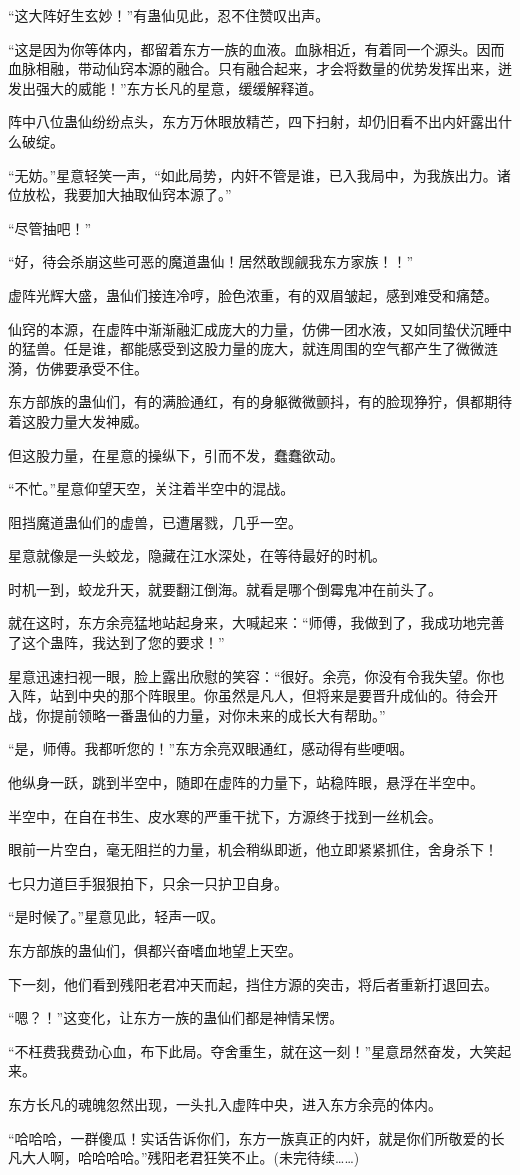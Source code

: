 \begin{this_body}
“这大阵好生玄妙！”有蛊仙见此，忍不住赞叹出声。

“这是因为你等体内，都留着东方一族的血液。血脉相近，有着同一个源头。因而血脉相融，带动仙窍本源的融合。只有融合起来，才会将数量的优势发挥出来，迸发出强大的威能！”东方长凡的星意，缓缓解释道。

阵中八位蛊仙纷纷点头，东方万休眼放精芒，四下扫射，却仍旧看不出内奸露出什么破绽。

“无妨。”星意轻笑一声，“如此局势，内奸不管是谁，已入我局中，为我族出力。诸位放松，我要加大抽取仙窍本源了。”

“尽管抽吧！”

“好，待会杀崩这些可恶的魔道蛊仙！居然敢觊觎我东方家族！！”

虚阵光辉大盛，蛊仙们接连冷哼，脸色浓重，有的双眉皱起，感到难受和痛楚。

仙窍的本源，在虚阵中渐渐融汇成庞大的力量，仿佛一团水液，又如同蛰伏沉睡中的猛兽。任是谁，都能感受到这股力量的庞大，就连周围的空气都产生了微微涟漪，仿佛要承受不住。

东方部族的蛊仙们，有的满脸通红，有的身躯微微颤抖，有的脸现狰狞，俱都期待着这股力量大发神威。

但这股力量，在星意的操纵下，引而不发，蠢蠢欲动。

“不忙。”星意仰望天空，关注着半空中的混战。

阻挡魔道蛊仙们的虚兽，已遭屠戮，几乎一空。

星意就像是一头蛟龙，隐藏在江水深处，在等待最好的时机。

时机一到，蛟龙升天，就要翻江倒海。就看是哪个倒霉鬼冲在前头了。

就在这时，东方余亮猛地站起身来，大喊起来：“师傅，我做到了，我成功地完善了这个蛊阵，我达到了您的要求！”

星意迅速扫视一眼，脸上露出欣慰的笑容：“很好。余亮，你没有令我失望。你也入阵，站到中央的那个阵眼里。你虽然是凡人，但将来是要晋升成仙的。待会开战，你提前领略一番蛊仙的力量，对你未来的成长大有帮助。”

“是，师傅。我都听您的！”东方余亮双眼通红，感动得有些哽咽。

他纵身一跃，跳到半空中，随即在虚阵的力量下，站稳阵眼，悬浮在半空中。

半空中，在自在书生、皮水寒的严重干扰下，方源终于找到一丝机会。

眼前一片空白，毫无阻拦的力量，机会稍纵即逝，他立即紧紧抓住，舍身杀下！

七只力道巨手狠狠拍下，只余一只护卫自身。

“是时候了。”星意见此，轻声一叹。

东方部族的蛊仙们，俱都兴奋嗜血地望上天空。

下一刻，他们看到残阳老君冲天而起，挡住方源的突击，将后者重新打退回去。

“嗯？！”这变化，让东方一族的蛊仙们都是神情呆愣。

“不枉费我费劲心血，布下此局。夺舍重生，就在这一刻！”星意昂然奋发，大笑起来。

东方长凡的魂魄忽然出现，一头扎入虚阵中央，进入东方余亮的体内。

“哈哈哈，一群傻瓜！实话告诉你们，东方一族真正的内奸，就是你们所敬爱的长凡大人啊，哈哈哈哈。”残阳老君狂笑不止。(未完待续……)

\end{this_body}

